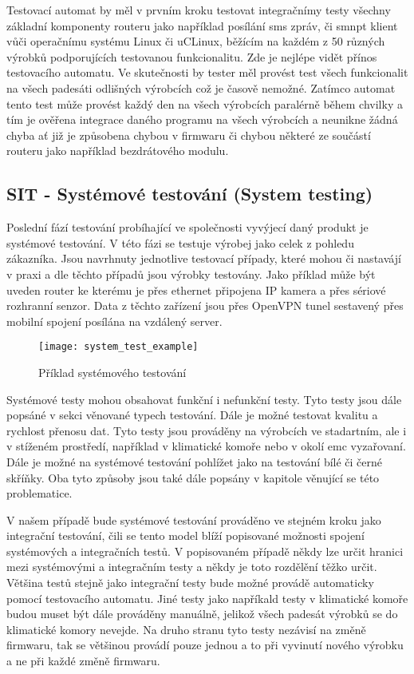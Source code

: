 Testovací automat by měl v prvním kroku testovat integračnímy testy všechny základní komponenty routeru jako například posílání sms zpráv, či smnpt klient vůči operačnímu systému Linux či uCLinux, běžícím na každém z 50 různých výrobků podporujících testovanou funkcionalitu. Zde je nejlépe vidět přínos testovacího automatu. Ve skutečnosti by tester měl provést test všech funkcionalit na všech padesáti odlišných výrobcích což je časově nemožné. Zatímco automat tento test může provést každý den na všech výrobcích paralérně během chvilky a tím je ověřena integrace daného programu na všech výrobcích a neunikne žádná chyba ať již je způsobena chybou v firmwaru či chybou některé ze součástí routeru jako například bezdrátového modulu.

\subsection{SIT - Systémové testování (System testing)}
Poslední fází testování probíhající ve společnosti vyvýjecí daný produkt je systémové testování. V této fázi se testuje výrobej jako celek z pohledu zákazníka. Jsou navrhnuty jednotlive testovací případy, které mohou či nastavájí v praxi a dle těchto případů jsou výrobky testovány. Jako příklad může být uveden router ke kterému je přes ethernet připojena IP kamera a přes sériové rozhranní senzor. Data z těchto zařízení jsou přes OpenVPN tunel sestavený přes mobilní spojení posílána na vzdálený server.

\begin{figure}[h]
  \centering
  \texttt{[image: system\_test\_example]}
  \caption{Příklad systémového testování}
  \label{fig:system_test_example}
\end{figure}

Systémové testy mohou obsahovat funkční i nefunkční testy. Tyto testy jsou dále popsáné v sekci věnované typech testování. Dále je možné testovat kvalitu a rychlost přenosu dat. Tyto testy jsou prováděny na výrobcích ve stadartním, ale i v stíženém prostředí, například v klimatické komoře nebo v okolí emc vyzařovaní. Dále je možné na systémové testování pohlížet jako na testování bílé či černé skříňky. Oba tyto způsoby jsou také dále popsány v kapitole věnující se této problematice.

V našem případě bude systémové testování prováděno ve stejném kroku jako integrační testování, čili se tento model blíží popisované možnosti spojení systémových a integračních testů. V popisovaném případě někdy lze určit hranici mezi systémovými a integračním testy a někdy je toto rozdělění těžko určit. Většina testů stejně jako integrační testy bude možné provádě automaticky pomocí testovacího automatu. Jiné testy jako napříkald testy v klimatické komoře budou muset být dále prováděny manuálně, jelikož všech padesát výrobků se do klimatické komory nevejde. Na druho stranu tyto testy nezávisí na změně firmwaru, tak se většinou provádí pouze jednou a to při vyvinutí nového výrobku a ne při každé změně firmwaru.

